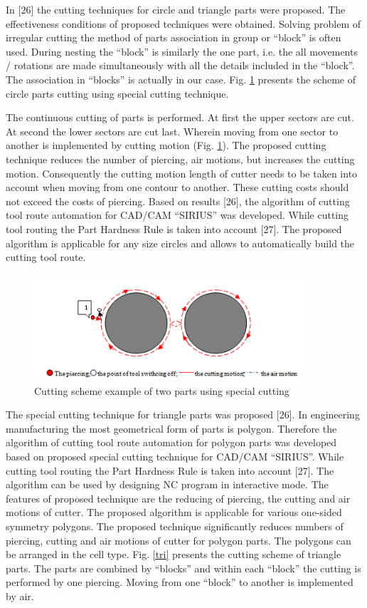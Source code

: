 \documentclass[runningheads]{llncs}
\begin{document}
In [26] the cutting techniques for circle and triangle parts were proposed.
The effectiveness conditions of proposed techniques were obtained.
Solving problem of irregular cutting the method of parts association
in group or ``block'' is often used.
During nesting the ``block'' is similarly the one part,
i.e. the all movements / rotations are made simultaneously
with all the details included in the ``block''.
The association in ``blocks'' is actually in our case.
Fig. \ref{8} presents the scheme of circle parts cutting using special cutting technique.

The continuous cutting of parts is performed.
At first the upper sectors are cut.
At second the lower sectors are cut last.
Wherein moving from one sector to another is implemented by cutting motion (Fig. \ref{8}).
The proposed cutting technique reduces the number of piercing, air motions,
but increases the cutting motion.
Consequently the cutting motion length of cutter needs to be taken into account
when moving from one contour to another.
These cutting costs should not exceed the costs of piercing.
Based on results [26],
the algorithm of cutting tool route automation for CAD/CAM ``SIRIUS'' was developed.
While cutting tool routing the Part Hardness Rule is taken into account [27].
The proposed algorithm is applicable for any size circles
and allows to automatically build the cutting tool route.

\begin{figure}
  \begin{center}
  \includegraphics[width=0.9\textwidth]{8.png}
  \caption{Cutting scheme example of two parts using special cutting}
  \label{8}
  \end{center}
\end{figure}

The special cutting technique for triangle parts was proposed [26].
In engineering manufacturing the most geometrical form of parts is polygon.
Therefore the algorithm of cutting tool route automation for polygon parts
was developed based on proposed special cutting technique for CAD/CAM ``SIRIUS''.
While cutting tool routing the Part Hardness Rule is taken into account [27].
The algorithm can be used by designing NC program in interactive mode.
The features of proposed technique are the reducing of piercing,
the cutting and air motions of cutter.
The proposed algorithm is applicable for various one-sided symmetry polygons.
The proposed technique significantly reduces numbers of piercing,
cutting and air motions of cutter for polygon parts.
The polygons can be arranged in the cell type.
Fig. \ref{tri} presents the cutting scheme of triangle parts.
The parts are combined by ``blocks'' and within each ``block''
the cutting is performed by one piercing.
Moving from one ``block'' to another is implemented by air.
\end{document}
